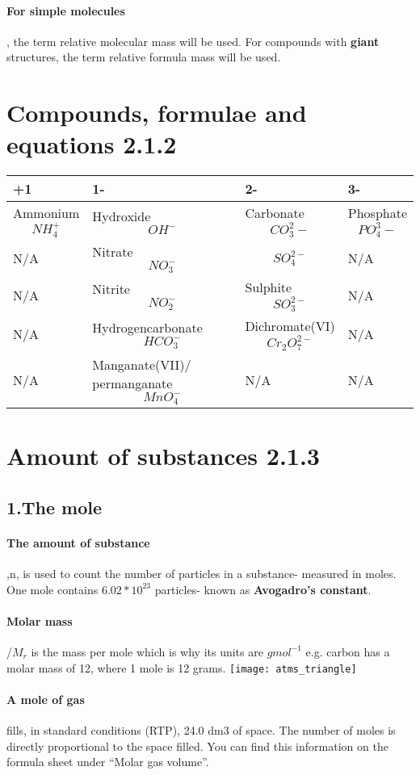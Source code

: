 \paragraph{For simple molecules}, the term relative molecular mass will be used.
For compounds with \textbf{giant} structures, the term relative formula mass will be used.
\section{Compounds, formulae and equations 2.1.2}
\begin{tabular}{ |p{3cm}||p{4cm}||p{3cm}||p{3cm}|  }
 \hline
 +1    & 1- &2-&3-\\
 \hline
 Ammonium \[ NH_4^+ \]    & Hydroxide \[OH^-\]    &Carbonate \[CO_3^ 2-\]& Phosphate \[PO_4^ 3-\]\\
 N/A& Nitrate \[NO_3^-\]  & \[SO_4^{2-}\]  & N/A\\
 N/A& Nitrite \[NO_2^-\]  & Sulphite \[SO_3^{2-}\]& N/A\\
 \hline
 N/A & Hydrogencarbonate \[HCO_3^-\] & Dichromate(VI) \[Cr_2O_7^{2-}\] & N/A\\
 \hline
 N/A & Manganate(VII)/ permanganate \[MnO_4^-\] &N/A&N/A\\
 \hline
\end{tabular}
\section{Amount of substances 2.1.3}
\subsection{1.The mole}
\paragraph{The amount of substance},n, is used to count the number of particles in a substance- measured in moles. One mole contains \textbf{\(6.02*10^{23}\)} particles- known as \textbf{Avogadro's constant}.
\paragraph{Molar mass} /\(M_r\) is the mass per mole which is why its units are \(gmol^{-1}\) e.g. carbon has a molar mass of 12, where 1 mole is 12 grams.
\newline\texttt{[image: atms\_triangle]}
\paragraph{A mole of gas} fills, in standard conditions (RTP), 24.0 dm3 of space. The number of moles is directly proportional to the space filled. You can find this information on the formula sheet under “Molar gas volume”.
